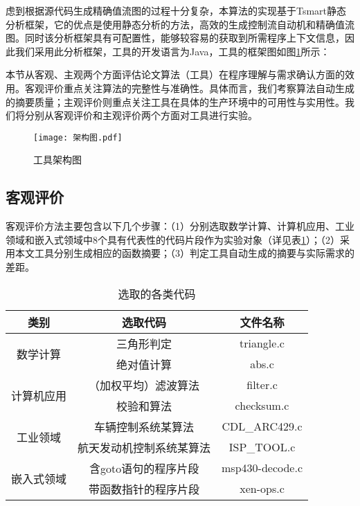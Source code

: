 虑到根据源代码生成精确值流图的过程十分复杂，本算法的实现基于Tsmart静态分析框架，它的优点是使用静态分析的方法，高效的生成控制流自动机和精确值流图。同时该分析框架具有可配置性，能够较容易的获取到所需程序上下文信息，因此我们采用此分析框架，工具的开发语言为Java，工具的框架图如图\ref{fig:架构图}所示：

本节从客观、主观两个方面评估论文算法（工具）在程序理解与需求确认方面的效用。客观评价重点关注算法的完整性与准确性。具体而言，我们考察算法自动生成的摘要质量；主观评价则重点关注工具在具体的生产环境中的可用性与实用性。我们将分别从客观评价和主观评价两个方面对工具进行实验。

\begin{figure}[H]
	\centering
	\texttt{[image: 架构图.pdf]}
	\caption{工具架构图}
	\label{fig:架构图}
\end{figure}

\subsection{客观评价}

客观评价方法主要包含以下几个步骤：（1）分别选取数学计算、计算机应用、工业领域和嵌入式领域中8个具有代表性的代码片段作为实验对象（详见表\ref{tab:selectedCodes}）；（2）采用本文工具分别生成相应的函数摘要；（3）判定工具自动生成的摘要与实际需求的差距。

\begin{table}[htb]
	\centering
	\caption{选取的各类代码}
	\label{tab:selectedCodes}
	\begin{tabular}{|c|c|c|}
		\hline
		类别 & 选取代码 & 文件名称 \\ \hline
		\multirow{2}{*}{数学计算} & 三角形判定 & triangle.c \\ \cline{2-3} 
		& 绝对值计算 & abs.c \\ \hline
		\multirow{2}{*}{计算机应用} & （加权平均）滤波算法 & filter.c \\ \cline{2-3} 
		& 校验和算法 & checksum.c \\ \hline
		\multirow{2}{*}{工业领域} & 车辆控制系统某算法 & CDL\_ARC429.c \\ \cline{2-3} 
		& 航天发动机控制系统某算法 & ISP\_TOOL.c \\ \hline
		\multirow{2}{*}{嵌入式领域} & 含goto语句的程序片段 & msp430-decode.c \\ \cline{2-3} 
		& 带函数指针的程序片段 & xen-ops.c \\ \hline
	\end{tabular}
\end{table}


